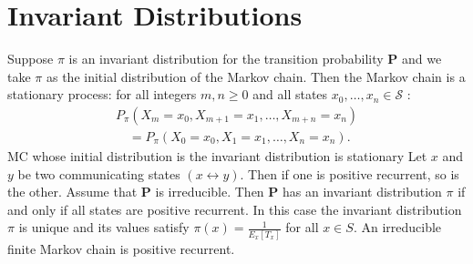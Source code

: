 \documentclass{report}
\begin{document}
  \section{Invariant Distributions}%
     {
      Suppose $\pi$ is an invariant distribution for the transition probability $\mathbf{P}$ and we take $\pi$ as the initial distribution of the Markov chain. Then the Markov chain is a stationary process: for all integers $m, n \geq 0$ and all states $x_0, \ldots, x_n \in \mathcal{S}$ :
$$
\begin{array}{r}
P_\pi\left(X_m=x_0, X_{m+1}=x_1, \ldots, X_{m+n}=x_n\right) \\
\quad=P_\pi\left(X_0=x_0, X_1=x_1, \ldots, X_n=x_n\right) .
\end{array}
$$
    }
     {
      MC whose initial distribution is the invariant distribution
      is stationary
    }
     {
      Let $x$ and $y$ be two communicating states $(x \longleftrightarrow y)$. Then if one is positive recurrent, so is the other.
    }
     {
       Assume that $\mathbf{P}$ is irreducible. Then $\mathbf{P}$ has an invariant distribution $\pi$ if and only if all states are positive recurrent. In this case the invariant distribution $\pi$ is unique and its values satisfy $\pi(x)=\frac{1}{E_x\left[T_x\right]}$ for all $x \in S$.
    }
     {
      An irreducible finite Markov chain is positive recurrent.
    }
\end{document}
